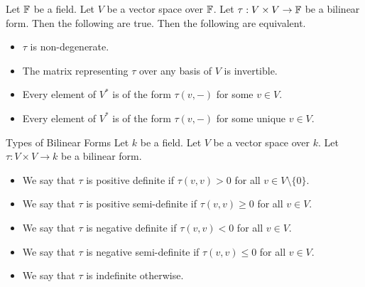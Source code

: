 \documentclass[a4paper]{article}
\begin{document}
\begin{prp}{}{} Let $\mathbb{F}$ be a field. Let $V$ be a vector space over $\mathbb{F}$. Let $\tau:V\times V\to\mathbb{F}$ be a bilinear form. Then the following are true. Then the following are equivalent. 
\begin{itemize}
\item $\tau$ is non-degenerate. 
\item The matrix representing $\tau$ over any basis of $V$ is invertible. 
\item Every element of $V^\ast$ is of the form $\tau(v,-)$ for some $v\in V$. 
\item Every element of $V^\ast$ is of the form $\tau(v,-)$ for some unique $v\in V$. 
\end{itemize}
\end{prp}

\begin{defn}{Types of Bilinear Forms}{} Let $k$ be a field. Let $V$ be a vector space over $k$. Let $\tau:V\times V\to k$ be a bilinear form. 
\begin{itemize}
\item We say that $\tau$ is positive definite if $\tau(v,v)>0$ for all $v\in V\setminus\{0\}$. 
\item We say that $\tau$ is positive semi-definite if $\tau(v,v)\geq 0$ for all $v\in V$. 
\item We say that $\tau$ is negative definite if $\tau(v,v)<0$ for all $v\in V$. 
\item We say that $\tau$ is negative semi-definite if $\tau(v,v)\leq 0$ for all $v\in V$. 
\item We say that $\tau$ is indefinite otherwise. 
\end{itemize}
\end{defn}
\end{document}
